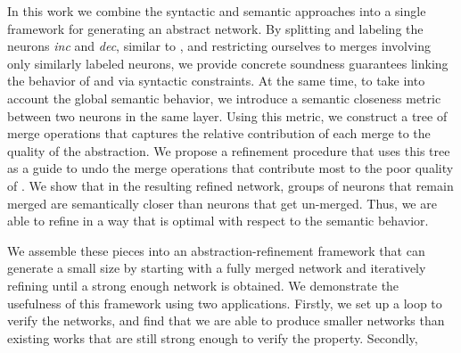 In this work we combine the syntactic and semantic approaches into a single
framework for generating an abstract network. By splitting and labeling the
neurons \textit{inc} and \textit{dec}, similar to \cite{cegar-nn}, and
restricting ourselves to merges involving only similarly labeled neurons, we
provide concrete soundness guarantees linking the behavior of \cnc and \abs via
syntactic constraints. At the same time, to take into account the global
semantic behavior, we introduce a semantic closeness metric between two neurons
in the same layer.  Using this metric, we construct a tree of merge operations
that captures the relative contribution of each merge to the quality of the
abstraction. We propose a refinement procedure that uses this tree as a guide
to undo the merge operations that contribute most to the poor quality of \abs.
We show that in the resulting refined network, groups of neurons that remain
merged are semantically closer than neurons that get un-merged. Thus, we are
able to refine \abs in a way that is optimal with respect to the semantic
behavior.

We assemble these pieces into an abstraction-refinement framework that can
generate a small size \abs by starting with a fully merged network and
iteratively refining until a strong enough network is obtained. We demonstrate
the usefulness of this framework using two applications. Firstly, we set up a
\cegar loop to verify the \acasxu networks, and find that we are able to produce
smaller networks than existing works that are still strong enough to verify the
property. Secondly,



